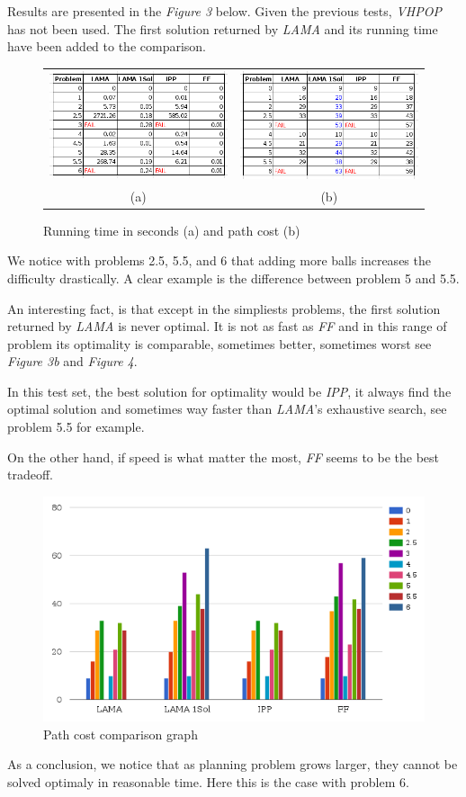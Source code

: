 Results are presented in the \textit{Figure 3} below. Given the previous tests,
\textit{VHPOP} has not been used. The first solution returned by \textit{LAMA}
and its running time have been added to the comparison.

\begin{figure}[h]
    \centering
    \begin{tabular}{cc}
      \includegraphics[width=.49\linewidth,scale=1]{./images/tab3.png} &
\includegraphics[width=.49\linewidth, scale=1.5]{./images/tab4.png} \\
      (a) & (b)
    \end{tabular}
    \caption{Running time in seconds (a) and path cost (b)}
\end{figure}


We notice with problems 2.5, 5.5, and 6 that adding more balls
increases the difficulty drastically. A clear example is the difference
between problem 5 and 5.5.

An interesting fact, is that except in the simpliests problems, the first
solution returned by \textit{LAMA} is never optimal. It is not as fast as
\textit{FF} and in this range of problem its optimality is comparable, sometimes
better, sometimes worst see \textit{Figure 3b} and \textit{Figure 4}.

In this test set, the best solution for optimality would be \textit{IPP}, it
always find the optimal solution and sometimes way faster than \textit{LAMA}'s
exhaustive search, see problem 5.5 for example.

On the other hand, if speed is what matter the most, \textit{FF} seems to be
the best tradeoff.

\newpage
\thispagestyle{empty}
\begin{figure}[h]
    \centering
      \includegraphics[width=.65\linewidth,scale=1]{./images/graph.png}
    \caption{Path cost comparison graph}
\end{figure}

As a conclusion, we notice that as planning problem grows larger, they
cannot be solved optimaly in reasonable time. Here this is the case with problem 6.
